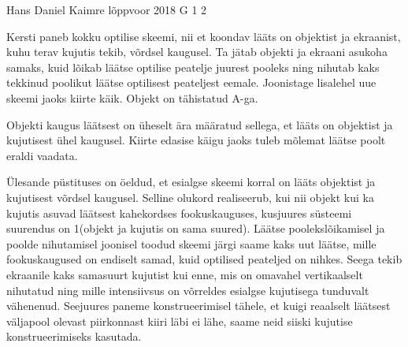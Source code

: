 {Hans Daniel Kaimre} %
{lõppvoor} %
{2018} %
{G 1} %
{2} %
{
\ifStatement
Kersti paneb kokku optilise skeemi, nii et koondav lääts on objektist ja ekraanist, kuhu terav kujutis tekib, võrdsel kaugusel. Ta jätab objekti ja ekraani asukoha samaks, kuid lõikab läätse optilise peatelje juurest pooleks ning nihutab kaks tekkinud poolikut läätse optilisest peateljest eemale. Joonistage lisalehel uue skeemi jaoks kiirte käik. Objekt on tähistatud A-ga.
\begin{center}
\end{center}
\fi


\ifHint
Objekti kaugus läätsest on üheselt ära määratud sellega, et lääts on objektist ja kujutisest ühel kaugusel. Kiirte edasise käigu jaoks tuleb mõlemat läätse poolt eraldi vaadata.
\fi


\ifSolution
Ülesande püstituses on öeldud, et esialgse skeemi korral on lääts objektist ja kujutisest võrdsel kaugusel. Selline olukord realiseerub, kui nii objekt kui ka kujutis asuvad läätsest kahekordses fookuskauguses, kusjuures süsteemi suurendus on 1(objekt ja kujutis on sama suured). Läätse poolekslõikamisel ja poolde nihutamisel joonisel toodud skeemi järgi saame kaks uut läätse, mille fookuskaugused on endiselt samad, kuid optilised peateljed on nihkes. Seega tekib ekraanile kaks samasuurt kujutist kui enne, mis on omavahel vertikaalselt nihutatud ning mille intensiivsus on võrreldes esialgse kujutisega tunduvalt vähenenud. Seejuures paneme konstrueerimisel tähele, et kuigi reaalselt läätsest väljapool olevast piirkonnast kiiri läbi ei lähe, saame neid siiski kujutise konstrueerimiseks kasutada.

\begin{center}


\end{center}}
